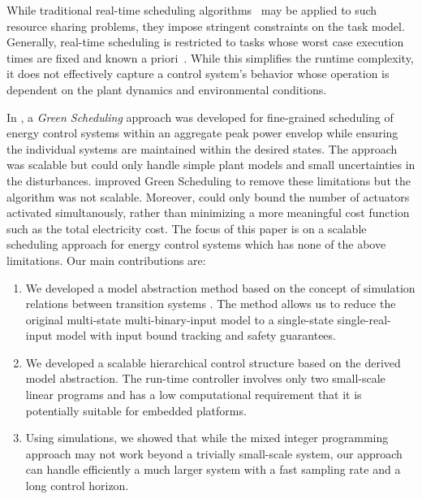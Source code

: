 While traditional real-time scheduling algorithms~\cite{realtimesys} may be applied to such resource sharing problems, they impose stringent constraints on the task model.
Generally, real-time scheduling is restricted to tasks whose worst case execution times are fixed and known a priori~\cite{rts}.
While this simplifies the runtime complexity, %
it does not effectively capture a control system's behavior whose operation is dependent on the plant dynamics and environmental conditions. 

In \cite{nghiemetal12ssb}, %
a \emph{Green Scheduling} approach was developed for fine-grained scheduling of energy control systems within an aggregate peak power envelop while ensuring the individual systems are maintained within the desired states.
The approach was scalable but could only handle simple plant models and small uncertainties in the disturbances.
\cite{nghiemetal13ebg} improved Green Scheduling to remove these limitations but the algorithm was not scalable.
Moreover, \cite{nghiemetal12ssb,nghiemetal13ebg} could only bound the number of actuators activated simultanously, rather than minimizing a more meaningful cost function such as the total electricity cost.
%
The focus of this paper is on a scalable %
scheduling approach for energy control systems which has none of the above limitations.
Our main contributions are:
\begin{enumerate}
\item We developed a model abstraction method based on the concept of simulation relations between transition systems \cite{aluretal00dah,girardetal07amd}.  The method allows us to reduce the original multi-state multi-binary-input model to a single-state single-real-input model with input bound tracking and safety guarantees.
\item We developed a scalable hierarchical control structure based on the derived model abstraction.  The run-time controller involves only two small-scale linear programs and has a low computational requirement that it is potentially suitable for embedded platforms.  
\item Using simulations, we showed that while the mixed integer programming approach \cite{sou2011scheduling,zhang2011optimal} may not work beyond a trivially small-scale system, our approach can handle efficiently a much larger system with a fast sampling rate and a long control horizon.
\end{enumerate}
 

